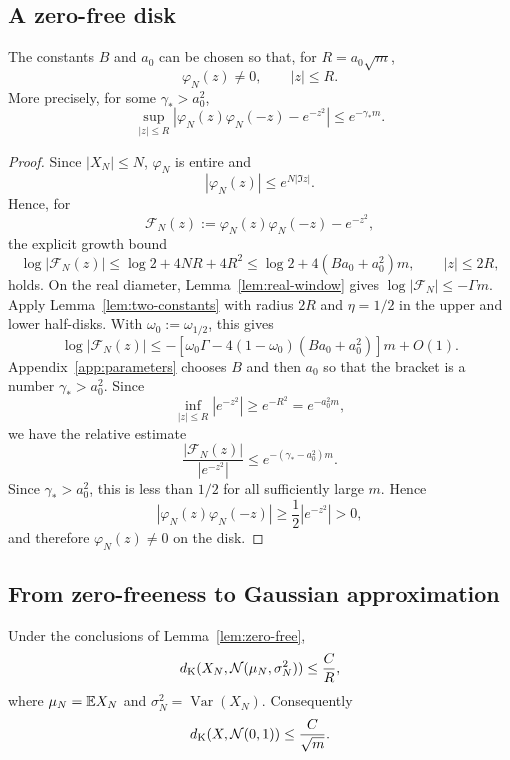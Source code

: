 \subsection{A zero-free disk}

\begin{lemma}\label{lem:zero-free}
The constants $B$ and $a_0$ can be chosen so that, for $R=a_0\sqrt m$,
\[
\varphi_N(z)\ne0,
\qquad |z|\le R.
\]
More precisely, for some $\gamma_*>a_0^2$,
\[
\sup_{|z|\le R}
\left|\varphi_N(z)\varphi_N(-z)-e^{-z^2}\right|
\le e^{-\gamma_*m}.
\]
\end{lemma}

\begin{proof}
Since $|X_N|\le N$, $\varphi_N$ is entire and
\[
|\varphi_N(z)|\le e^{N|\Im z|}.
\]
Hence, for
\[
\mathcal F_N(z):=\varphi_N(z)\varphi_N(-z)-e^{-z^2},
\]
the explicit growth bound
\[
\log|\mathcal F_N(z)|\le\log2+4NR+4R^2
\le\log2+4(Ba_0+a_0^2)m,
\qquad |z|\le2R,
\]
holds. On the real diameter, Lemma~\ref{lem:real-window} gives $\log|\mathcal F_N|\le-\Gamma m$. Apply Lemma~\ref{lem:two-constants} with radius $2R$ and $\eta=1/2$ in the upper and lower half-disks. With $\omega_0:=\omega_{1/2}$, this gives
\[
\log|\mathcal F_N(z)|
\le-\left[\omega_0\Gamma-4(1-\omega_0)(Ba_0+a_0^2)\right]m+O(1).
\]
Appendix~\ref{app:parameters} chooses $B$ and then $a_0$ so that the bracket is a number $\gamma_*>a_0^2$. Since
\[
\inf_{|z|\le R}|e^{-z^2}|\ge e^{-R^2}=e^{-a_0^2m},
\]
we have the relative estimate
\[
\frac{|\mathcal F_N(z)|}{|e^{-z^2}|}
\le e^{-(\gamma_*-a_0^2)m}.
\]
Since $\gamma_*>a_0^2$, this is less than $1/2$ for all sufficiently large $m$. Hence
\[
|\varphi_N(z)\varphi_N(-z)|
\ge\frac12|e^{-z^2}|>0,
\]
and therefore $\varphi_N(z)\ne0$ on the disk.
\end{proof}

\subsection{From zero-freeness to Gaussian approximation}

\begin{lemma}\label{lem:factor-gaussian}
Under the conclusions of Lemma~\ref{lem:zero-free},
\[
d_{\mathrm K}(X_N,\mathcal N(\mu_N,\sigma_N^2))\le \frac{C}{R},
\]
where $\mu_N=\mathbb E X_N$ and $\sigma_N^2=\operatorname{Var}(X_N)$. Consequently
\[
d_{\mathrm K}(X,\mathcal N(0,1))\le \frac{C}{\sqrt m}.
\]
\end{lemma}

